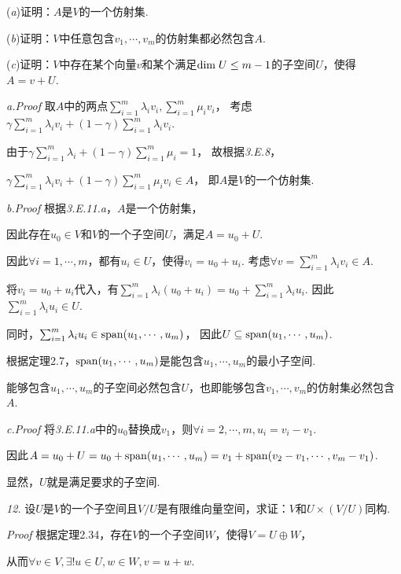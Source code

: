 (\textit{a})证明：\(A\)是\(V\)的一个仿射集.

(\textit{b})证明：\(V\)中任意包含\(v_1,\cdots,v_m\)的仿射集都必然包含\(A\).

(\textit{c})证明：\(V\)中存在某个向量\(v\)和某个满足\(\mathrm{dim \;} U \leq m-1\)的子空间\(U\)，使得\(A=v+U\).

\textit{a.Proof}
取\(A\)中的两点\(\sum_{i=1}^m \lambda_i v_i,\sum_{i=1}^m \mu_i v_i\)，
考虑\(\gamma \sum_{i=1}^m \lambda_i v_i+(1-\gamma)\sum_{i=1}^m \lambda_i v_i\).

由于\(\gamma \sum_{i=1}^m \lambda_i+(1-\gamma)\sum_{i=1}^m \mu_i=1\)，
故根据\textit{3.E.8}，

\(\gamma \sum_{i=1}^m \lambda_i v_i+(1-\gamma)\sum_{i=1}^m \mu_i v_i \in A\)，
即\(A\)是\(V\)的一个仿射集.

\textit{b.Proof}
根据\textit{3.E.11.a}，\(A\)是一个仿射集，

因此存在\(u_0 \in V\)和\(V\)的一个子空间\(U\)，满足\(A=u_0+U\).

因此\(\forall i=1,\cdots,m\)，都有\(u_i \in U\)，使得\(v_i=u_0+u_i\).
考虑\(\forall v=\sum_{i=1}^m \lambda_i v_i \in A\).

将\(v_i=u_0+u_i\)代入，有\(\sum_{i=1}^m \lambda_i(u_0+u_i)=u_0+\sum_{i=1}^m \lambda_i u_i\).
因此\(\sum_{i=1}^m \lambda_i u_i \in U\).

同时，\(\sum_{i=1}^m \lambda_i u_i \in \mathrm{span} (u_1,\cdots,u_m)\)，
因此\(U \subseteq \mathrm{span} (u_1,\cdots,u_m)\).

根据定理2.7，\(\mathrm{span} (u_1,\cdots,u_m)\)是能包含\(u_1,\cdots,u_m\)的最小子空间.

能够包含\(u_1,\cdots,u_m\)的子空间必然包含\(U\)，也即能够包含\(v_1,\cdots,v_m\)的仿射集必然包含\(A\).

\textit{c.Proof}
将\textit{3.E.11.a}中的\(u_0\)替换成\(v_1\)，则\(\forall i=2,\cdots,m,u_i=v_i-v_1\).

因此\(A=u_0+U=u_0+\mathrm{span} (u_1,\cdots,u_m)=v_1+\mathrm{span} (v_2-v_1,\cdots,v_m-v_1)\).

显然，\(U\)就是满足要求的子空间.

\hspace*{\fill}

\textit{12.}
设\(U\)是\(V\)的一个子空间且\(V/U\)是有限维向量空间，求证：\(V\)和\(U \times (V/U)\)同构.

\textit{Proof}
根据定理2.34，存在\(V\)的一个子空间\(W\)，使得\(V=U \oplus W\)，

从而\(\forall v \in V, \exists! u \in U,w \in W,v=u+w\).

